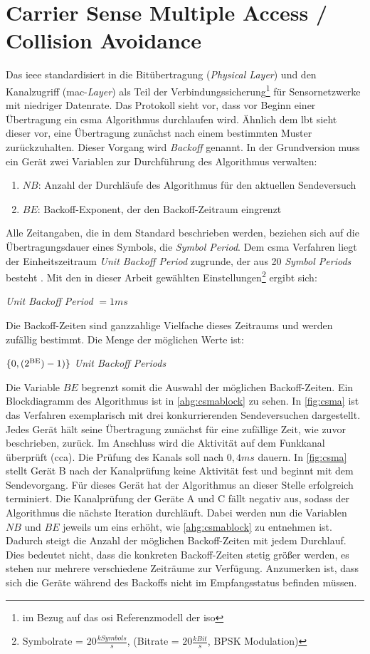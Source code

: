 \section{Carrier Sense Multiple Access / Collision Avoidance}\label{kap:zugriffsverfahren_sec:csma}
Das \ac{ieee} standardisiert in \cite{ieee} die Bitübertragung (\emph{Physical Layer}) und den Kanalzugriff (\acs{mac}-\emph{Layer}) als Teil der Verbindungssicherung\footnote{im Bezug auf das \acl{osi} Referenzmodell der \acs{iso}} für Sensornetzwerke mit niedriger Datenrate. Das Protokoll sieht vor, dass vor Beginn einer Übertragung ein \acl{csma} Algorithmus durchlaufen wird. Ähnlich dem \acs{lbt} sieht dieser vor, eine Übertragung zunächst nach einem bestimmten Muster zurückzuhalten. Dieser Vorgang wird \emph{Backoff} genannt. In der Grundversion muss ein Gerät zwei Variablen zur Durchführung des Algorithmus verwalten:
\begin{enumerate}
	\item $NB$: Anzahl der Durchläufe des Algorithmus für den aktuellen Sendeversuch
	\item $BE$: Backoff-Exponent, der den Backoff-Zeitraum eingrenzt
\end{enumerate}
Alle Zeitangaben, die in dem Standard beschrieben werden, beziehen sich auf die Übertragungsdauer eines Symbols, die \emph{Symbol Period}. Dem \acs{csma} Verfahren liegt der Einheitszeitraum \emph{Unit Backoff Period} zugrunde, der aus 20 \emph{Symbol Periods} besteht \cite{ieee}. Mit den in dieser Arbeit gewählten Einstellungen\footnote{Symbolrate = $20 \frac{kSymbols}{s}$, (Bitrate = $20 \frac{kBit}{s}$, BPSK Modulation)} ergibt sich:
\begin{center}
\emph{Unit Backoff Period} $ = 1ms$
\end{center}
Die Backoff-Zeiten sind ganzzahlige Vielfache dieses Zeitraums und  werden zufällig bestimmt. Die Menge der möglichen Werte ist: 
\begin{center}
$\{0, (2\textsuperscript{BE})-1)\}$  \emph{Unit Backoff Periods}
\end{center}
Die Variable $BE$ begrenzt somit die Auswahl der möglichen Backoff-Zeiten. Ein Blockdiagramm des Algorithmus ist in \autoref{ahg:csmablock} zu sehen. In \autoref{fig:csma} ist das Verfahren exemplarisch mit drei konkurrierenden Sendeversuchen dargestellt. Jedes Gerät hält seine Übertragung zunächst für eine zufällige Zeit, wie zuvor beschrieben, zurück. Im Anschluss wird die Aktivität auf dem Funkkanal überprüft (\acf{cca}). Die Prüfung des Kanals soll nach \citep{ieee} $0,4ms$ dauern. In \autoref{fig:csma} stellt Gerät B nach der Kanalprüfung keine Aktivität fest und beginnt mit dem Sendevorgang. Für dieses Gerät hat der Algorithmus an dieser Stelle erfolgreich terminiert. Die Kanalprüfung der Geräte A und C fällt negativ aus, sodass der Algorithmus die nächste Iteration durchläuft. Dabei werden nun die Variablen $NB$ und $BE$ jeweils um eins erhöht, wie \autoref{ahg:csmablock} zu entnehmen ist. Dadurch steigt die Anzahl der möglichen Backoff-Zeiten mit jedem Durchlauf. Dies bedeutet nicht, dass die konkreten Backoff-Zeiten stetig größer werden, es stehen nur mehrere verschiedene Zeiträume zur Verfügung.
Anzumerken ist, dass sich die Geräte während des Backoffs nicht im Empfangsstatus befinden müssen. 

